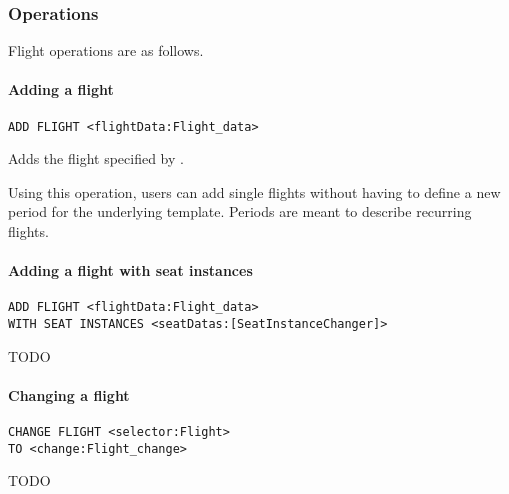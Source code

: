 \subsubsection{Operations}
Flight operations are as follows.


\paragraph{Adding a flight}
\begin{operation}
  \label{op:add_flight}
  \begin{lstlisting}
ADD FLIGHT <flightData:Flight_data>
  \end{lstlisting}
\end{operation}
Adds the flight specified by .

Using this operation, users can add single flights without having to define a
new period for the underlying template. Periods are meant to describe recurring
flights.

\paragraph{Adding a flight with seat instances}
\begin{operation}
  \begin{lstlisting}
ADD FLIGHT <flightData:Flight_data>
WITH SEAT INSTANCES <seatDatas:[SeatInstanceChanger]>
  \end{lstlisting}
\end{operation}
TODO

\paragraph{Changing a flight}
\begin{operation}
  \begin{lstlisting}
CHANGE FLIGHT <selector:Flight>
TO <change:Flight_change>
  \end{lstlisting}
\end{operation}
TODO

